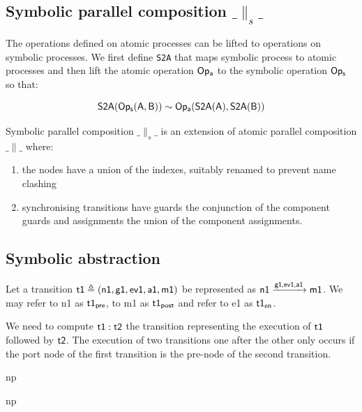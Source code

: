 \documentclass[]{article}
\begin{document}
\subsection{Symbolic parallel composition $\_\parallel_s\_$}
The operations defined on atomic processes can be lifted to operations on symbolic processes. We first define \verb|S2A| that maps symbolic process to atomic processes and then lift  the atomic  operation ${\sf Op_a}$ to the symbolic operation ${\sf Op_s}$ so that:

\[{\sf S2A(Op_s(A,B))\sim  Op_a(S2A(A),S2A(B)) }\]

Symbolic parallel composition $\_\parallel_s\_$ is an extension of  atomic parallel composition $\_\parallel\_$ where:
\begin{enumerate}
\item the nodes have a union of the indexes, suitably renamed to prevent name clashing
\item synchronising transitions have guards the conjunction of the component guards and assignments the union of the component assignments.
\end{enumerate}


\subsection{Symbolic abstraction}


Let a transition  ${\sf t1 \triangleq (n1,g1,ev1,a1,m1)}$  be represented as   ${\sf n1\xrightarrow{\text{\sf g1,ev1,a1}} m1}$. We may refer to {\sf n1}  as ${\sf t1_{pre}}$,  to {\sf m1}  as ${\sf t1_{post}}$ and refer to {\sf e1}  as ${\sf t1_{en}}$.

We need to  compute $\sf t1: t2$  the transition representing the execution of $\sf t1$ followed by $\sf t2$.  The execution of two transitions one after the other only occurs if the port node of the first transition is the pre-node of the second transition.




\begin{center}\begin{minipage}{0.75\textwidth}
{{\sf np }}
\end{minipage}
\qquad
\begin{minipage}{0.75\textwidth}
{{\sf np }}
\end{minipage}\end{center}
\end{document}
